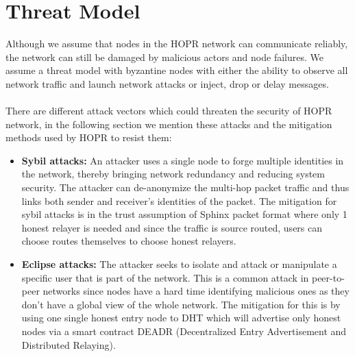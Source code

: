 \section{Threat Model}

Although we assume that nodes in the HOPR network can communicate reliably, the
network can still be damaged by malicious actors and node failures. We assume a
threat model with byzantine nodes with either the ability to observe all network
traffic and launch network attacks or inject, drop or delay messages. \\~\\There
are different attack vectors which could threaten the security of HOPR network,
in the following section we mention these attacks and the mitigation methods
used by HOPR to resist them:

\begin{itemize}
    \item \textbf{Sybil attacks:} An attacker uses a single node to forge
    multiple identities in the network, thereby bringing network redundancy and
    reducing system security. The attacker can de-anonymize the multi-hop packet traffic and thus links both sender and receiver's identities of the packet. The mitigation for sybil attacks is in the trust assumption of Sphinx packet format where only 1 honest relayer is needed and since the traffic is source routed, users can choose routes themselves to choose honest relayers. 
    \item \textbf{Eclipse attacks:} The attacker seeks to isolate and attack or
    manipulate a specific user that is part of the network. This is a common
    attack in peer-to-peer networks since nodes have a hard time identifying
    malicious ones as they don't have a global view of the whole network. The mitigation for this is by using one single honest entry node to DHT which will advertise only honest nodes via a smart contract DEADR (Decentralized Entry Advertisement and Distributed Relaying).
    
\end{itemize}
